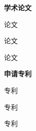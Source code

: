 


\begin{flushleft}
\textbf{\Large 学术论文}
\begin{enumerate}[label={[\arabic*]}]
\item  论文
\item  论文
\item  论文
\end{enumerate}
\end{flushleft}
\hspace{2cm}

\begin{flushleft}
\textbf{\Large 申请专利}
\begin{enumerate}[label={[\arabic*]}]
\item  专利
\item  专利
\item  专利
\end{enumerate}
\end{flushleft}
